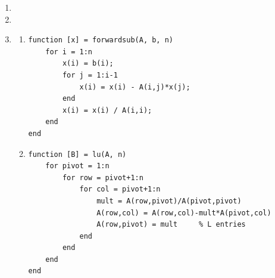 \documentclass[12pt, letterpaper]{article}
\begin{document}
\begin{enumerate}
\begin{enumerate}[(a)]
\begin{align*}
                x_1 &= \frac12(\frac{43}{2}) - \frac12(-\frac{23}{42}) \\
                    &= \frac{463}{42}
            \end{align*}
            \begin{align*}
                A\vec x &= \vec b \\
                \begin{bmatrix}
                    -2 & 0 & 1 &-1 \\
                    -1 & 2 & 0 & 1 \\
                    4 & -1 & -2 &-4 \\
                    0 & 0 & 2 & 0
                \end{bmatrix} 
                \begin{bmatrix}
                        \frac{463}{42} \\
                        \frac{44}{7} \\
                        \frac{43}{2} \\
                        -\frac{23}{42}
                \end{bmatrix}
                &= 
                \begin{bmatrix}
                        0 \\
                        1 \\
                        2 \\
                        3
                \end{bmatrix}
            \end{align*}
        \end{enumerate}
    \item %
    \item %
    \item %
        \begin{enumerate}
            \item 
                \begin{verbatim}
function [x] = forwardsub(A, b, n)
    for i = 1:n
        x(i) = b(i);
        for j = 1:i-1
            x(i) = x(i) - A(i,j)*x(j);
        end
        x(i) = x(i) / A(i,i);
    end
end
                \end{verbatim}
            \item
                \begin{verbatim}
function [B] = lu(A, n)
    for pivot = 1:n
        for row = pivot+1:n
            for col = pivot+1:n
                mult = A(row,pivot)/A(pivot,pivot)
                A(row,col) = A(row,col)-mult*A(pivot,col)
                A(row,pivot) = mult     % L entries
            end
        end
    end
end
                \end{verbatim}
        \end{enumerate}
\end{enumerate}
\end{document}
